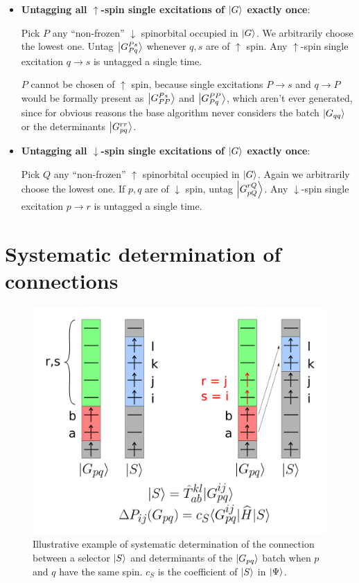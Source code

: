 \documentclass[./thesis.tex]{subfiles}
\begin{document}
\begin{itemize}
\item
\textbf{Untagging all $\uparrow$-spin single excitations of $\ket G$ exactly once}:

Pick $P$ any ``non-frozen'' $\downarrow$ spinorbital occupied in $\ket G$. We arbitrarily choose the lowest one. Untag $\ket {G_{Pq}^{Ps}}$ whenever $q,s$ are of $\uparrow$ spin. Any $\uparrow$-spin single excitation $q \rightarrow  s$ is untagged a single time.

$P$ cannot be chosen of $\uparrow$ spin, because single excitations $P \rightarrow  s$ and $q \rightarrow  P$ would be formally present as $\ket{G_{PP}^{Ps}}$ and $\ket{G_{Pq}^{PP}}$, which aren't ever generated, since for obvious reasons the base algorithm never considers the batch $\ket{G_{qq}}$ or the determinants $\ket {G_{pq}^{rr}}$.
\item
\textbf{Untagging all $\downarrow$-spin single excitations of $\ket G$ exactly once}:

Pick $Q$ any ``non-frozen'' $\uparrow$ spinorbital occupied in $\ket G$. Again we arbitrarily choose the lowest one. If $p,q$ are of $\downarrow$ spin, untag $\ket{G_{pQ}^{rQ}}$. Any $\downarrow$-spin single excitation $p \rightarrow  r$ is untagged a single time.
\end{itemize}



\section{Systematic determination of connections}

\begin{figure}[h!]
        \begin{center}
                \includegraphics[width=0.70\columnwidth]{figures/cipsi/systematic_determination}
        \end{center}
        \caption{Illustrative example of systematic determination of the connection between a selector $\ket S$ and determinants of the $\ket {G_{pq}}$ batch when $p$ and $q$ have the same spin. $c_S$ is the coefficient of $\ket S$ in $\ket \Psi$.}
        \label{fig:systematic_determination}
        
\end{figure}
\end{document}
